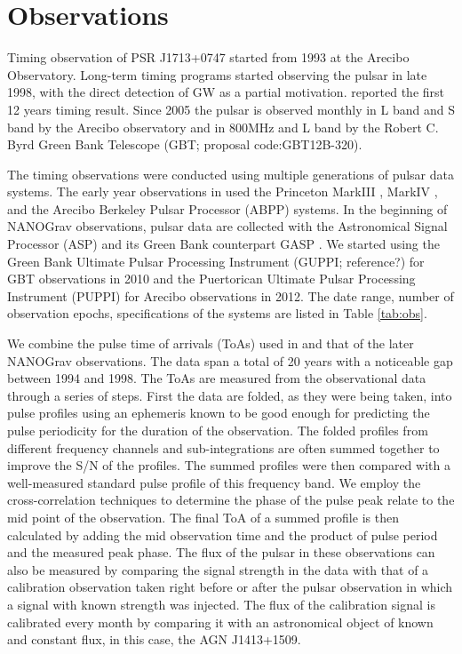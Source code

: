 \section{Observations}
Timing observation of PSR J1713+0747 started from 1993 at the Arecibo
Observatory. Long-term timing programs started observing the pulsar in late 1998, with the direct detection of GW as a partial motivation. \citet{sns+05} reported the first 12 years timing result. Since 2005 the pulsar is observed monthly
in L band and S band by the Arecibo
observatory and in 800MHz and L band by the Robert C. Byrd Green Bank
Telescope (GBT; proposal code:GBT12B-320).

The timing observations were conducted 
using multiple generations of pulsar data systems. The early year
observations in \citet{sns+05} used
 the Princeton MarkIII \citep{skn+92}, MarkIV
\citep{sst+00}, and the Arecibo Berkeley Pulsar Processor (ABPP) systems. 
In the beginning of NANOGrav observations, pulsar data are collected with the Astronomical Signal
Processor (ASP) and its Green Bank counterpart GASP \citep{dem07}. We
started using 
the Green Bank Ultimate Pulsar Processing Instrument (GUPPI; reference?) for GBT 
observations in 2010 and the Puertorican Ultimate Pulsar Processing Instrument
(PUPPI) for Arecibo observations in 2012. 
The date range, number of observation epochs, specifications of the
systems are listed in Table \ref{tab:obs}.

We combine the pulse time of arrivals (ToAs) used in \citealt{sns+05} and that
of the later NANOGrav observations. 
The data span a total of 20 years with a noticeable gap between 1994 and 1998.
The ToAs are measured from the observational data through a series of steps. First the data are folded, as they were being taken, into pulse profiles using an ephemeris known to be good enough for predicting the pulse periodicity for the duration of the observation. The folded profiles from different frequency channels and sub-integrations are often summed together to improve the S/N of the profiles.
The summed profiles were then compared with a well-measured standard pulse profile  of this frequency band. We employ the cross-correlation techniques to determine the phase of the pulse peak relate to the mid point of the observation. The final ToA of a summed profile is then calculated by adding the mid observation time and the product of pulse period and the measured peak phase.
The flux of the pulsar in these observations can also be measured by comparing the signal strength in the data with that of a calibration observation taken right before or after the pulsar observation in which a signal with known strength was injected. The flux of the calibration signal is calibrated every month by comparing it with an astronomical object of known and constant flux, in this case, the AGN J1413+1509.




